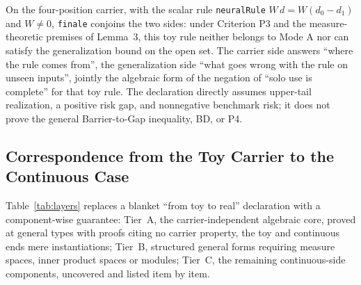 On the four-position carrier, with the scalar rule \texttt{neuralRule} $W\,d=W(d_0-d_1)$ and $W\ne0$, \texttt{finale} conjoins the two sides: under Criterion P3 and the measure-theoretic premises of Lemma~3, this toy rule neither belongs to Mode A nor can satisfy the generalization bound on the open set. The carrier side answers ``where the rule comes from'', the generalization side ``what goes wrong with the rule on unseen inputs'', jointly the algebraic form of the negation of ``solo use is complete'' for that toy rule. The declaration directly assumes upper-tail realization, a positive risk gap, and nonnegative benchmark risk; it does not prove the general Barrier-to-Gap inequality, BD, or P4.

\subsection{Correspondence from the Toy Carrier to the Continuous Case}
\label{sec:layers}

Table~\ref{tab:layers} replaces a blanket ``from toy to real'' declaration with a component-wise guarantee: Tier~A, the carrier-independent algebraic core, proved at general types with proofs citing no carrier property, the toy and continuous ends mere instantiations; Tier~B, structured general forms requiring measure spaces, inner product spaces or modules; Tier~C, the remaining continuous-side components, uncovered and listed item by item.


